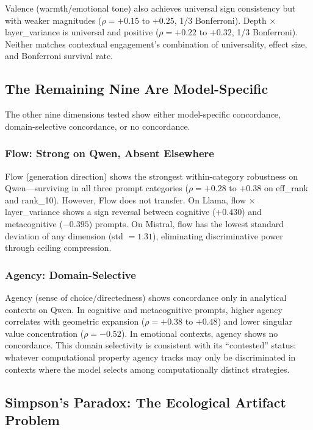 \documentclass[11pt,a4paper]{article}
\begin{document}
Valence (warmth/emotional tone) also achieves universal sign consistency but with weaker magnitudes ($\rho = +0.15$ to $+0.25$, 1/3 Bonferroni). Depth $\times$ layer\_variance is universal and positive ($\rho = +0.22$ to $+0.32$, 1/3 Bonferroni). Neither matches contextual engagement's combination of universality, effect size, and Bonferroni survival rate.

\subsection{The Remaining Nine Are Model-Specific}

The other nine dimensions tested show either model-specific concordance, domain-selective concordance, or no concordance.

\subsubsection{Flow: Strong on Qwen, Absent Elsewhere}

Flow (generation direction) shows the strongest within-category robustness on Qwen---surviving in all three prompt categories ($\rho = +0.28$ to $+0.38$ on eff\_rank and rank\_10). However, Flow does not transfer. On Llama, flow $\times$ layer\_variance shows a sign reversal between cognitive ($+0.430$) and metacognitive ($-0.395$) prompts. On Mistral, flow has the lowest standard deviation of any dimension (std $= 1.31$), eliminating discriminative power through ceiling compression.

\subsubsection{Agency: Domain-Selective}

Agency (sense of choice/directedness) shows concordance only in analytical contexts on Qwen. In cognitive and metacognitive prompts, higher agency correlates with geometric expansion ($\rho = +0.38$ to $+0.48$) and lower singular value concentration ($\rho = -0.52$). In emotional contexts, agency shows no concordance. This domain selectivity is consistent with its ``contested'' status: whatever computational property agency tracks may only be discriminated in contexts where the model selects among computationally distinct strategies.

\subsection{Simpson's Paradox: The Ecological Artifact Problem}
\label{sec:simpson}
\end{document}
